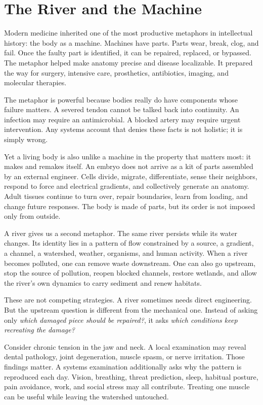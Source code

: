 \chapter{The River and the Machine}\label{chapter-1-the-river-and-the-machine}

Modern medicine inherited one of the most productive metaphors in intellectual history: the body as a machine. Machines have parts. Parts wear, break, clog, and fail. Once the faulty part is identified, it can be repaired, replaced, or bypassed. The metaphor helped make anatomy precise and disease localizable. It prepared the way for surgery, intensive care, prosthetics, antibiotics, imaging, and molecular therapies.

The metaphor is powerful because bodies really do have components whose failure matters. A severed tendon cannot be talked back into continuity. An infection may require an antimicrobial. A blocked artery may require urgent intervention. Any systems account that denies these facts is not holistic; it is simply wrong.

Yet a living body is also unlike a machine in the property that matters most: it makes and remakes itself. An embryo does not arrive as a kit of parts assembled by an external engineer. Cells divide, migrate, differentiate, sense their neighbors, respond to force and electrical gradients, and collectively generate an anatomy. Adult tissues continue to turn over, repair boundaries, learn from loading, and change future responses. The body is made of parts, but its order is not imposed only from outside.

A river gives us a second metaphor. The same river persists while its water changes. Its identity lies in a pattern of flow constrained by a source, a gradient, a channel, a watershed, weather, organisms, and human activity. When a river becomes polluted, one can remove waste downstream. One can also go upstream, stop the source of pollution, reopen blocked channels, restore wetlands, and allow the river's own dynamics to carry sediment and renew habitats.

These are not competing strategies. A river sometimes needs direct engineering. But the upstream question is different from the mechanical one. Instead of asking only \emph{which damaged piece should be repaired?}, it asks \emph{which conditions keep recreating the damage?}

Consider chronic tension in the jaw and neck. A local examination may reveal dental pathology, joint degeneration, muscle spasm, or nerve irritation. Those findings matter. A systems examination additionally asks why the pattern is reproduced each day. Vision, breathing, threat prediction, sleep, habitual posture, pain avoidance, work, and social stress may all contribute. Treating one muscle can be useful while leaving the watershed untouched.

